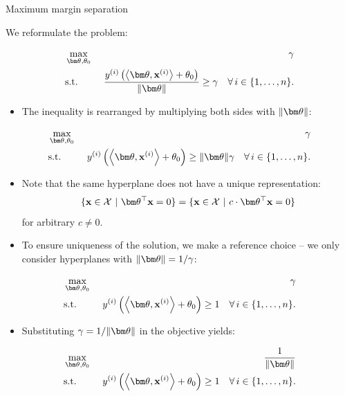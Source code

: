 \documentclass[11pt,compress,t,notes=noshow, xcolor=table]{beamer}
\begin{document}
\begin{vbframe}{Maximum margin separation}

We reformulate the problem:

\begin{eqnarray*}
   & \max \limits_{\thetav, \theta_0} & \gamma \\
   & \text{s.t.} & \,\, \frac{\yi \left( \scp{\thetav}{\xi} + \theta_0 \right)}{\|\thetav\|} \geq \gamma \quad \forall\, i \in \nset.
\end{eqnarray*}

\begin{itemize}
  \item The inequality is rearranged by multiplying both sides with $\|\thetav\|$:
\end{itemize}

\begin{eqnarray*}
   & \max \limits_{\thetav, \theta_0} & \gamma \\
   & \text{s.t.} & \,\,\yi  \left( \scp{\thetav}{\xi} + \theta_0 \right) \geq \|\thetav\| \gamma \quad \forall\, i \in \nset.
\end{eqnarray*}

\framebreak

  \begin{itemize}
    \item Note that the same hyperplane does not have a unique representation:
    $$
      \{\xv \in \Xspace ~|~ \thetav^\top \xv = 0\} = \{\xv \in \Xspace ~|~ c \cdot \thetav^\top \xv = 0\}
    $$
    for arbitrary $c \ne 0$.
    \item To ensure uniqueness of the solution, we make a reference choice -- we only consider hyperplanes with $\|\thetav\| = 1 / \gamma$:
  \end{itemize}

  \begin{eqnarray*}
     & \max \limits_{\thetav, \theta_0} & \gamma \\
     & \text{s.t.} & \,\,\yi  \left( \scp{\thetav}{\xi} + \theta_0 \right) \geq 1 \quad \forall\, i \in \nset.
  \end{eqnarray*}

\framebreak

  \begin{itemize}
    \item Substituting $\gamma = 1 / \|\thetav\|$ in the objective yields:
  \end{itemize}

  \begin{eqnarray*}
     & \max \limits_{\thetav, \theta_0} & \frac{1}{\|\thetav\|} \\
     & \text{s.t.} & \,\,\yi  \left( \scp{\thetav}{\xi} + \theta_0 \right) \geq 1 \quad \forall\, i \in \nset.
  \end{eqnarray*}


\end{vbframe}
\end{document}
